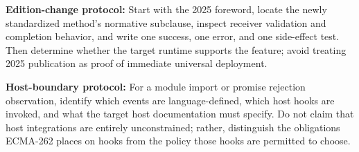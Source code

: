 \documentclass[11pt,letterpaper]{article}
\begin{document}
\textbf{Edition-change protocol:} Start with the 2025 foreword, locate the newly standardized method's normative subclause, inspect receiver validation and completion behavior, and write one success, one error, and one side-effect test. Then determine whether the target runtime supports the feature; avoid treating 2025 publication as proof of immediate universal deployment.

\textbf{Host-boundary protocol:} For a module import or promise rejection observation, identify which events are language-defined, which host hooks are invoked, and what the target host documentation must specify. Do not claim that host integrations are entirely unconstrained; rather, distinguish the obligations ECMA-262 places on hooks from the policy those hooks are permitted to choose.
\end{document}
